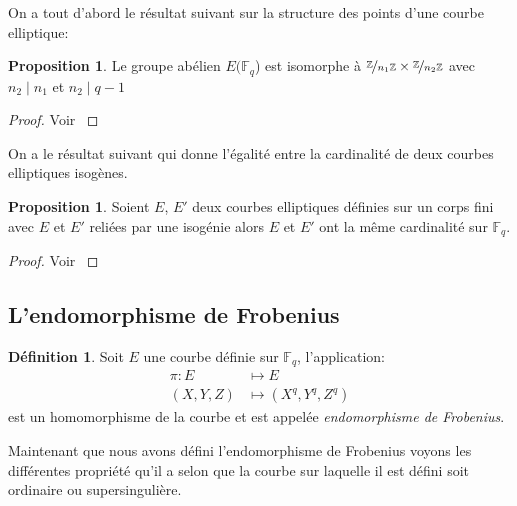 \documentclass[10pt,a4paper]{book}
\theoremstyle{plain}
\theoremstyle{definition}
\theoremstyle{definition}
\theoremstyle{definition}
\newtheorem{prop}[thm]{Proposition}
\theoremstyle{definition}
\newtheorem{defi}[thm]{Définition}
\theoremstyle{remark}
\theoremstyle{remark}
\theoremstyle{definition}
\begin{document}
On a tout d'abord le résultat suivant sur la structure des points d'une courbe elliptique:
\begin{prop}
Le groupe abélien $E(\mathbb{F}_q$) est isomorphe à $\nicefrac{\mathbb{Z}}{n_1 \mathbb{Z}} \times \nicefrac{\mathbb{Z}}{n_2 \mathbb{Z}}$ avec $n_2 \mid n_1$ et $n_2 \mid q-1$
\end{prop}

\begin{proof}
Voir \cite[Theorem 4.1]{Washington2008}
\end{proof}
On a le résultat suivant qui donne l'égalité entre la cardinalité de deux courbes elliptiques isogènes.

\begin{prop}
\label{pro:iso:ega}
Soient $E$, $E'$ deux courbes elliptiques définies sur un corps fini avec $E$ et $E'$ reliées par une isogénie alors $E$ et $E'$ ont la même cardinalité sur $\mathbb{F}_q$.
\end{prop}

\begin{proof}
Voir \cite[Exercise V.5.4.a]{Silv1}
\end{proof}

\subsection{L'endomorphisme de Frobenius}
\begin{defi}
Soit $E$ une courbe définie sur $\mathbb{F}_q$, l'application: 
\begin{equation*}
\begin{alignedat}{1}
\pi :E &\mapsto  E  \\
 (X,Y,Z)  &\mapsto (X^q,Y^q,Z^q)  
\end{alignedat}
\end{equation*}
est un homomorphisme de la courbe et est appelée \emph{endomorphisme de Frobenius}. 
\end{defi}

Maintenant que nous avons défini l'endomorphisme de Frobenius voyons les 
différentes propriété qu'il a selon que la courbe sur laquelle il est défini 
soit ordinaire ou supersingulière.
\end{document}
